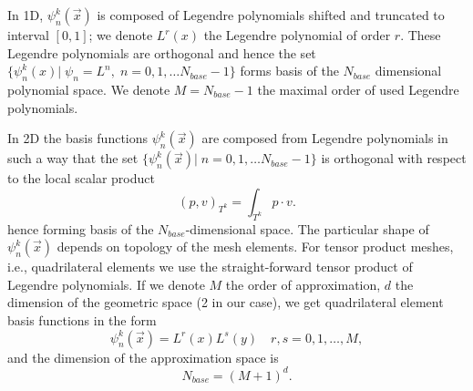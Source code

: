 In 1D, $\psi_n^k(\vec{x})$ is composed of Legendre polynomials shifted
and truncated to interval $[0, 1]$; we denote $L^r(x)$ the Legendre
polynomial of order $r$. These Legendre polynomials are orthogonal and hence
the set  $\{\psi_n^k(x)| \; \psi_n = L^n, \; n = 0,1, \dots  N_{base} -
1\}$ forms basis of the $N_{base}$ dimensional polynomial space. We denote $M = N_{base} -
1$ the maximal order of used Legendre polynomials.

In 2D the basis functions $\psi_n^k(\vec{x})$ are composed from Legendre
polynomials  in such a way that the set $\{\psi_n^k(\vec{x})| \; n = 0,1, \dots
N_{base} - 1\}$ is orthogonal with respect to the local
scalar product
\begin{equation}
\label{eq:scalar_prod_dk}
(p, v)_{T^k} = \int_{T^k} p \cdot v.
\end{equation}
hence forming basis of the $N_{base}$-dimensional space. The particular shape of
$\psi_n^k(\vec{x})$ depends on topology of the mesh elements. For
tensor product meshes, i.e., quadrilateral elements we use the straight-forward
tensor product of Legendre polynomials. If we denote $M$ the order of
approximation, $d$ the dimension of the geometric space (2 in our case), we get
quadrilateral element basis functions in the form
\begin{equation}
\psi_n^k(\vec{x}) = L^r(x)L^s(y)\quad r, s = 0,1, \dots, M,
\end{equation}
and the dimension of the approximation space is
\begin{equation}
N_{base} = (M + 1)^d.
\end{equation}

